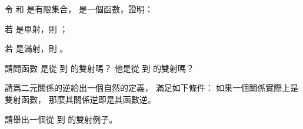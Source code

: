 \startsection[
  title={Functions},
]

\startEXERCISE
令  和  是有限集合，  是一個函數，證明：

\startigBase[a]\startitem
若  是單射，則 ；
\stopitem\stopigBase

\startigBase[continue]\startitem
若  是滿射，則 。
\stopitem\stopigBase
\stopEXERCISE

\startANSWER
{}
\stopANSWER

\startEXERCISE
請問函數  是從 \m{\naturalnumbers} 到 \m{\naturalnumbers} 的雙射嗎？
他是從 \m{\integers} 到 \m{\integers} 的雙射嗎？
\stopEXERCISE

\startANSWER
{}
\stopANSWER

\startEXERCISE
請爲二元關係的逆給出一個自然的定義，
滿足如下條件：
如果一個關係實際上是雙射函數，
那麼其關係逆即是其函數逆。
\stopEXERCISE

\startANSWER
{}
\stopANSWER

\startEXERCISE\DIFFICULT
請舉出一個從 \m{\integers} 到 \m{\integers\times\integers} 的雙射例子。
\stopEXERCISE

\startANSWER
{}
\stopANSWER

\stopsection
